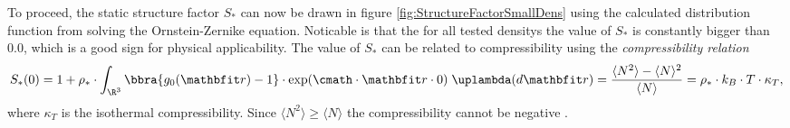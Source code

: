 To proceed, the static structure factor $S_*$ can now be drawn in figure \ref{fig:StructureFactorSmallDens} using the calculated distribution function from solving the Ornstein-Zernike equation. Noticable is that the for all tested densitys the value of $S_*$ is constantly bigger than $0.0$, which is a good sign for physical applicability. The value of $S_*$ can be related to compressibility using the \emph{compressibility relation}
\[
    S_*(0) = 1 + \rho_*\cdot\int_{\R^3}\bbra{g_0(\vr) - 1}\cdot\exp(\cmath\cdot \vr\cdot 0)\;\uplambda(d\vr) = \frac{\langle N^2\rangle - \langle N\rangle^2}{\langle N\rangle} = \rho_*\cdot k_B\cdot T\cdot\kappa_T,
\]
where $\kappa_T$ is the isothermal compressibility. Since $\langle N^2\rangle \geq \langle N\rangle$ the compressibility cannot be negative \cite{Hansen_McDonald_1979}. 

